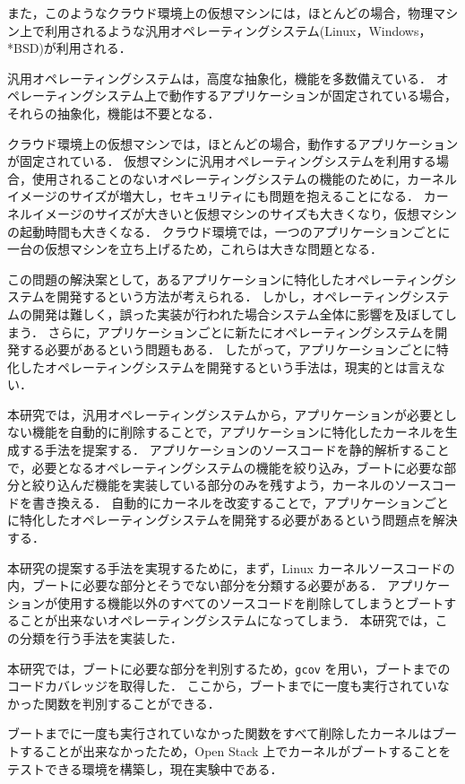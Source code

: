 \documentclass[graduation-thesis]{mlarticle}
\begin{document}
また，このようなクラウド環境上の仮想マシンには，ほとんどの場合，物理マシン上で利用されるような汎用オペレーティングシステム(Linux，Windows，*BSD)が利用される．

汎用オペレーティングシステムは，高度な抽象化，機能を多数備えている．
オペレーティングシステム上で動作するアプリケーションが固定されている場合，それらの抽象化，機能は不要となる．

クラウド環境上の仮想マシンでは，ほとんどの場合，動作するアプリケーションが固定されている．
仮想マシンに汎用オペレーティングシステムを利用する場合，使用されることのないオペレーティングシステムの機能のために，カーネルイメージのサイズが増大し，セキュリティにも問題を抱えることになる． 
カーネルイメージのサイズが大きいと仮想マシンのサイズも大きくなり，仮想マシンの起動時間も大きくなる．
クラウド環境では，一つのアプリケーションごとに一台の仮想マシンを立ち上げるため，これらは大きな問題となる．

この問題の解決案として，あるアプリケーションに特化したオペレーティングシステムを開発するという方法が考えられる．
しかし，オペレーティングシステムの開発は難しく，誤った実装が行われた場合システム全体に影響を及ぼしてしまう．
さらに，アプリケーションごとに新たにオペレーティングシステムを開発する必要があるという問題もある．
したがって，アプリケーションごとに特化したオペレーティングシステムを開発するという手法は，現実的とは言えない．


本研究では，汎用オペレーティングシステムから，アプリケーションが必要としない機能を自動的に削除することで，アプリケーションに特化したカーネルを生成する手法を提案する．
アプリケーションのソースコードを静的解析することで，必要となるオペレーティングシステムの機能を絞り込み，ブートに必要な部分と絞り込んだ機能を実装している部分のみを残すよう，カーネルのソースコードを書き換える．
自動的にカーネルを改変することで，アプリケーションごとに特化したオペレーティングシステムを開発する必要があるという問題点を解決する．

本研究の提案する手法を実現するために，まず，Linux カーネルソースコードの内，ブートに必要な部分とそうでない部分を分類する必要がある．
アプリケーションが使用する機能以外のすべてのソースコードを削除してしまうとブートすることが出来ないオペレーティングシステムになってしまう．
本研究では，この分類を行う手法を実装した．

本研究では，ブートに必要な部分を判別するため，\texttt{gcov} を用い，ブートまでのコードカバレッジを取得した．
ここから，ブートまでに一度も実行されていなかった関数を判別することができる．

ブートまでに一度も実行されていなかった関数をすべて削除したカーネルはブートすることが出来なかったため，Open Stack 上でカーネルがブートすることをテストできる環境を構築し，現在実験中である．
\end{document}
